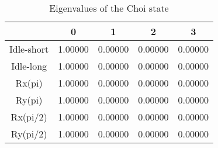 \begin{table}[h!]
\centering
\caption{Eigenvalues of the Choi state}
\begin{tabular}{c|*{4}{c}}
\toprule
 & 0 & 1 & 2 & 3 \\
\midrule
Idle-short & 1.00000 & 0.00000 & 0.00000 & 0.00000 \\
Idle-long & 1.00000 & 0.00000 & 0.00000 & 0.00000 \\
Rx(pi) & 1.00000 & 0.00000 & 0.00000 & 0.00000 \\
Ry(pi) & 1.00000 & 0.00000 & 0.00000 & 0.00000 \\
Rx(pi/2) & 1.00000 & 0.00000 & 0.00000 & 0.00000 \\
Ry(pi/2) & 1.00000 & 0.00000 & 0.00000 & 0.00000 \\
\bottomrule
\end{tabular}
\end{table}
